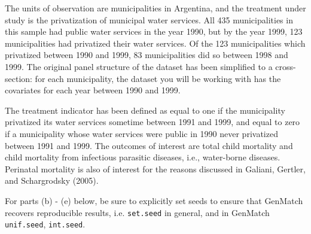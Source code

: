 \documentclass{article}
\begin{document}
\vspace{1em}
\noindent The units of observation are municipalities in Argentina, and the
treatment under study is the privatization of municipal water
services. All 435 municipalities in this sample had public water
services in the year 1990, but by the year 1999, 123 municipalities
had privatized their water services. Of the 123 municipalities which
privatized between 1990 and 1999, 83 municipalities did so between
1998 and 1999. The original panel structure of the dataset has been
simplified to a cross-section: for each municipality, the dataset you
will be working with has the covariates for each year between 1990 and
1999.

\vspace{1em}
\noindent
The treatment indicator has been defined as equal to one if the
municipality privatized its water services sometime between 1991 and
1999, and equal to zero if a municipality whose water services were
public in 1990 never privatized between 1991 and 1999. The outcomes of
interest are total child mortality and child mortality from infectious
parasitic diseases, i.e., water-borne diseases. Perinatal mortality
is also of interest for the reasons discussed in Galiani, Gertler, and
Schargrodsky (2005).  

\vspace{1em}
\noindent For parts (b) - (e) below, be sure to explicitly set seeds
to ensure that GenMatch recovers reproducible results,
i.e. \texttt{set.seed} in general, and in GenMatch \texttt{unif.seed}, \texttt{int.seed}.
\end{document}

